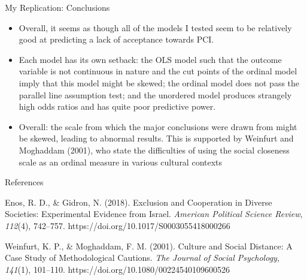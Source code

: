 \documentclass{beamer}
\begin{document}
\begin{frame}{My Replication: Conclusions}
	\begin{itemize}
		\item Overall, it seems as though all of the models I tested seem to be relatively good at predicting a lack of acceptance towards PCI. 
		\item Each model has its own setback: the OLS model such that the outcome variable is not continuous in nature and the cut points of the ordinal model imply that this model might be skewed; the ordinal model does not pass the parallel line assumption test; and the unordered model produces strangely high odds ratios and has quite poor predictive power. 
		\item Overall: the scale from which the major conclusions were drawn from might be skewed, leading to abnormal results. This is supported by Weinfurt and Moghaddam (2001), who state the difficulties of using the social closeness scale as an ordinal measure in various cultural contexts
	\end{itemize}
	
\end{frame}

\begin{frame}{References}
	\begin{list}{}{\setlength{\leftmargin}{2.5em}\setlength{\itemindent}{-2.5em}}
		\item[] Enos, R. D., \& Gidron, N. (2018). Exclusion and Cooperation in Diverse Societies: Experimental Evidence from Israel. \textit{American Political Science Review}, \textit{112}(4), 742–757. https://doi.org/10.1017/S0003055418000266
		\item[] Weinfurt, K. P., \& Moghaddam, F. M. (2001). Culture and Social Distance: A Case Study of Methodological Cautions. \textit{The Journal of Social Psychology}, \textit{141}(1), 101–110. https://doi.org/10.1080/00224540109600526
	\end{list}
	
\end{frame}
\end{document}
